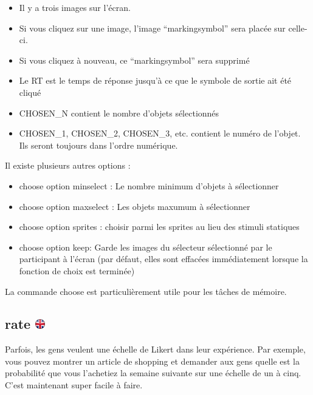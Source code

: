 \documentclass[
]{book}
\providecommand{\tightlist}{%
  \setlength{\itemsep}{0pt}\setlength{\parskip}{0pt}}
\begin{document}
\begin{itemize}
\tightlist
\item
  Il y a trois images sur l'écran.
\item
  Si vous cliquez sur une image, l'image ``markingsymbol'' sera placée sur celle-ci.
\item
  Si vous cliquez à nouveau, ce ``markingsymbol'' sera supprimé
\item
  Le RT est le temps de réponse jusqu'à ce que le symbole de sortie ait été cliqué
\item
  CHOSEN\_N contient le nombre d'objets sélectionnés
\item
  CHOSEN\_1, CHOSEN\_2, CHOSEN\_3, etc. contient le numéro de l'objet. Ils seront toujours dans l'ordre numérique.
\end{itemize}

Il existe plusieurs autres options :

\begin{itemize}
\tightlist
\item
  choose option minselect : Le nombre minimum d'objets à sélectionner
\item
  choose option maxselect : Les objets maxumum à sélectionner
\item
  choose option sprites : choisir parmi les sprites au lieu des stimuli statiques
\item
  choose option keep: Garde les images du sélecteur sélectionné par le participant à l'écran (par défaut, elles sont effacées immédiatement lorsque la fonction de choix est terminée)
\end{itemize}

La commande choose est particulièrement utile pour les tâches de mémoire.

\hypertarget{rate}{%
\subsection[rate ]{\texorpdfstring{rate \href{https://www.psytoolkit.org/doc3.2.0/syntax.html\#task-rate}{\protect\includegraphics{img/ukflag.png}}}{rate }}\label{rate}}

Parfois, les gens veulent une échelle de Likert dans leur expérience. Par exemple, vous pouvez montrer un article de shopping et demander aux gens quelle est la probabilité que vous l'achetiez la semaine suivante sur une échelle de un à cinq. C'est maintenant super facile à faire.
\end{document}
